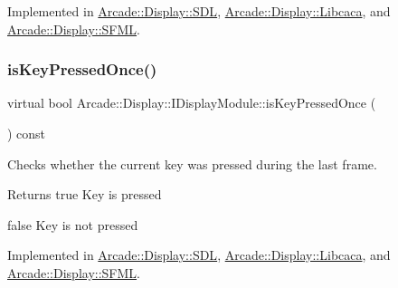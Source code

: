 Implemented in \mbox{\hyperlink{classArcade_1_1Display_1_1SDL_a375ea86360c510415d86a198f5cd3e30}{Arcade\+::\+Display\+::\+S\+DL}}, \mbox{\hyperlink{classArcade_1_1Display_1_1Libcaca_a4d76639289eee2453a416ff0fc051fe3}{Arcade\+::\+Display\+::\+Libcaca}}, and \mbox{\hyperlink{classArcade_1_1Display_1_1SFML_a760b5a751030b18d6c92eed5640f2c76}{Arcade\+::\+Display\+::\+S\+F\+ML}}.

\mbox{\label{classArcade_1_1Display_1_1IDisplayModule_ac347fc77c01e12c5ce23be99d357008d}} 
\subsubsection{\texorpdfstring{isKeyPressedOnce()}{isKeyPressedOnce()}}
{\footnotesize\ttfamily virtual bool Arcade\+::\+Display\+::\+I\+Display\+Module\+::is\+Key\+Pressed\+Once (\begin{DoxyParamCaption}\item[{\mbox{\hyperlink{classArcade_1_1Display_1_1IDisplayModule_a8da3f6b309ca0581473ae8cc8789b619}{I\+Display\+Module\+::\+Keys}}}]{ }\end{DoxyParamCaption}) const\hspace{0.3cm}{\ttfamily [pure virtual]}}



Checks whether the current key was pressed during the last frame. 

\begin{DoxyReturn}{Returns}
true Key is pressed 

false Key is not pressed 
\end{DoxyReturn}


Implemented in \mbox{\hyperlink{classArcade_1_1Display_1_1SDL_a883547b9f495cdf800225bc32b0ffe40}{Arcade\+::\+Display\+::\+S\+DL}}, \mbox{\hyperlink{classArcade_1_1Display_1_1Libcaca_a2de2c9cd935fbee371fa5215bd45c137}{Arcade\+::\+Display\+::\+Libcaca}}, and \mbox{\hyperlink{classArcade_1_1Display_1_1SFML_a499cc23f5567f0d9f8a9ba71cf30add9}{Arcade\+::\+Display\+::\+S\+F\+ML}}.

\mbox{\label{classArcade_1_1Display_1_1IDisplayModule_a34c86dd2e7aa60a70c0cc06ccbd34e47}} 
